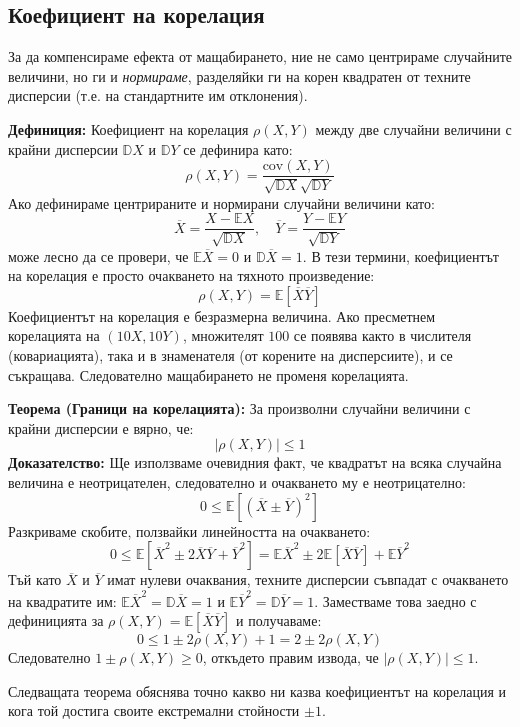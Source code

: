 \documentclass{article}
\begin{document}
\subsection{Коефициент на корелация}

За да компенсираме ефекта от мащабирането, ние не само центрираме случайните величини, но ги и \textit{нормираме}, разделяйки ги на корен квадратен от техните дисперсии (т.е. на стандартните им отклонения).

\textbf{Дефиниция:} Коефициент на корелация $\rho(X, Y)$ между две случайни величини с крайни дисперсии $\mathbb{D}X$ и $\mathbb{D}Y$ се дефинира като:
\[
\rho(X, Y) = \frac{\text{cov}(X, Y)}{\sqrt{\mathbb{D}X} \sqrt{\mathbb{D}Y}}
\]
Ако дефинираме центрираните и нормирани случайни величини като:
\[
\overline{X} = \frac{X - \mathbb{E}X}{\sqrt{\mathbb{D}X}}, \quad \overline{Y} = \frac{Y - \mathbb{E}Y}{\sqrt{\mathbb{D}Y}}
\]
може лесно да се провери, че $\mathbb{E}\overline{X} = 0$ и $\mathbb{D}\overline{X} = 1$. В тези термини, коефициентът на корелация е просто очакването на тяхното произведение:
\[
\rho(X, Y) = \mathbb{E}[\overline{X}\overline{Y}]
\]
Коефициентът на корелация е безразмерна величина. Ако пресметнем корелацията на $(10X, 10Y)$, множителят $100$ се появява както в числителя (ковариацията), така и в знаменателя (от корените на дисперсиите), и се съкращава. Следователно мащабирането не променя корелацията.

\textbf{Теорема (Граници на корелацията):} За произволни случайни величини с крайни дисперсии е вярно, че:
\[
|\rho(X, Y)| \le 1
\]
\textbf{Доказателство:} Ще използваме очевидния факт, че квадратът на всяка случайна величина е неотрицателен, следователно и очакването му е неотрицателно:
\[
0 \le \mathbb{E}[(\overline{X} \pm \overline{Y})^2]
\]
Разкриваме скобите, ползвайки линейността на очакването:
\[
0 \le \mathbb{E}[\overline{X}^2 \pm 2\overline{X}\overline{Y} + \overline{Y}^2] = \mathbb{E}\overline{X}^2 \pm 2\mathbb{E}[\overline{X}\overline{Y}] + \mathbb{E}\overline{Y}^2
\]
Тъй като $\overline{X}$ и $\overline{Y}$ имат нулеви очаквания, техните дисперсии съвпадат с очакването на квадратите им: $\mathbb{E}\overline{X}^2 = \mathbb{D}\overline{X} = 1$ и $\mathbb{E}\overline{Y}^2 = \mathbb{D}\overline{Y} = 1$. Заместваме това заедно с дефиницията за $\rho(X, Y) = \mathbb{E}[\overline{X}\overline{Y}]$ и получаваме:
\[
0 \le 1 \pm 2\rho(X, Y) + 1 = 2 \pm 2\rho(X, Y)
\]
Следователно $1 \pm \rho(X, Y) \ge 0$, откъдето правим извода, че $|\rho(X, Y)| \le 1$.

Следващата теорема обяснява точно какво ни казва коефициентът на корелация и кога той достига своите екстремални стойности $\pm 1$.
\end{document}
